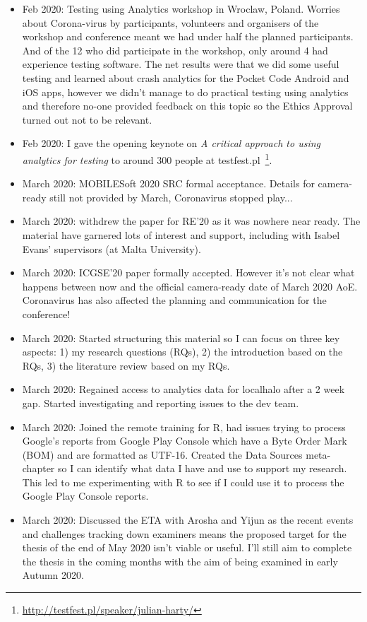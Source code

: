 \begin{itemize}
    \item {} Feb 2020: Testing using Analytics workshop in Wroclaw, Poland. Worries about Corona-virus by participants, volunteers and organisers of the workshop and conference meant we had under half the planned participants. And of the 12 who did participate in the workshop, only around 4 had experience testing software. The net results were that we did some useful testing and learned about crash analytics for the Pocket Code Android and iOS apps, however we didn't manage to do practical testing using analytics and therefore no-one provided feedback on this topic so the Ethics Approval turned out not to be relevant.
    \item {} Feb 2020: I gave the opening keynote on \emph{A critical approach to using analytics for testing} to around 300 people at testfest.pl~\footnote{\url{http://testfest.pl/speaker/julian-harty/}}.
    \item {} March 2020: MOBILESoft 2020 SRC formal acceptance. Details for camera-ready still not provided by  March, Coronavirus stopped play...
    \item {} March 2020: withdrew the paper for RE'20 as it was nowhere near ready. The material have garnered lots of interest and support, including with Isabel Evans' supervisors (at Malta University). 
    \item {} March 2020: ICGSE'20 paper formally accepted. However it's not clear what happens between now and the official camera-ready date of  March 2020 AoE. Coronavirus has also affected the planning and communication for the conference!
    \item {} March 2020: Started structuring this material so I can focus on three key aspects: 1) my research questions (RQs), 2) the introduction based on the RQs, 3) the literature review based on my RQs.
    \item {} March 2020: Regained access to analytics data for localhalo after a 2 week gap. Started investigating and reporting issues to the dev team.
    \item {} March 2020: Joined the remote training for R, had issues trying to process Google's reports from Google Play Console which have a Byte Order Mark (BOM) and are formatted as UTF-16. Created the Data Sources meta-chapter so I can identify what data I have and use to support my research. This led to me experimenting with R to see if I could use it to process the Google Play Console reports.
    \item {} March 2020: Discussed the ETA with Arosha and Yijun as the recent events and challenges tracking down examiners means the proposed target for the thesis of the end of May 2020 isn't viable or useful. I'll still aim to complete the thesis in the coming months with the aim of being examined in early Autumn 2020.

\end{itemize}
